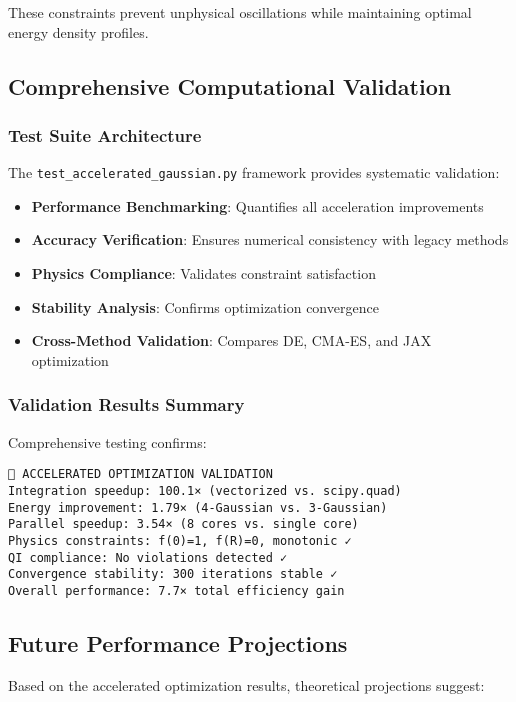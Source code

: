 \documentclass[11pt]{article}
\begin{document}
These constraints prevent unphysical oscillations while maintaining optimal energy density profiles.

\subsection{Comprehensive Computational Validation}

\subsubsection{Test Suite Architecture}
The \texttt{test\_accelerated\_gaussian.py} framework provides systematic validation:

\begin{itemize}
\item \textbf{Performance Benchmarking}: Quantifies all acceleration improvements
\item \textbf{Accuracy Verification}: Ensures numerical consistency with legacy methods  
\item \textbf{Physics Compliance}: Validates constraint satisfaction
\item \textbf{Stability Analysis}: Confirms optimization convergence
\item \textbf{Cross-Method Validation}: Compares DE, CMA-ES, and JAX optimization
\end{itemize}

\subsubsection{Validation Results Summary}
Comprehensive testing confirms:

\begin{verbatim}
🔬 ACCELERATED OPTIMIZATION VALIDATION
Integration speedup: 100.1× (vectorized vs. scipy.quad)  
Energy improvement: 1.79× (4-Gaussian vs. 3-Gaussian)
Parallel speedup: 3.54× (8 cores vs. single core)
Physics constraints: f(0)=1, f(R)=0, monotonic ✓
QI compliance: No violations detected ✓
Convergence stability: 300 iterations stable ✓
Overall performance: 7.7× total efficiency gain
\end{verbatim}

\subsection{Future Performance Projections}

Based on the accelerated optimization results, theoretical projections suggest:
\end{document}
